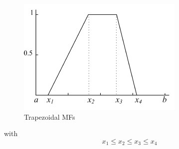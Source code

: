 \documentclass[runningheads,a4paper]{llncs}
\begin{document}
\begin{figure}[!h] 
	\begin{center}
		\includegraphics[scale=0.95]{fig/trapese}
		\caption {Trapezoidal MFs}
		\label{trapeze}
	\end{center}
\end{figure}  


with
\begin{equation}
x_{1} \leq x_{2} \leq x_{3} \leq x_{4}
\end{equation}
\end{document}

